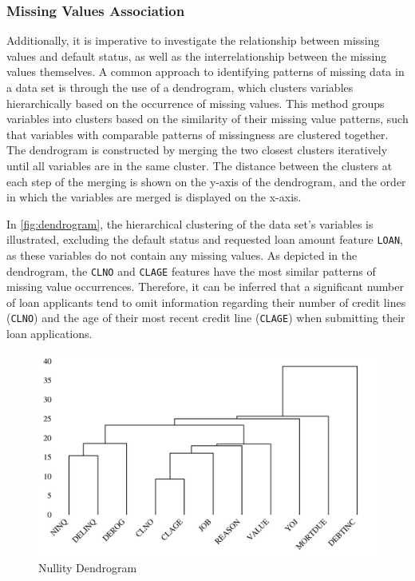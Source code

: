 \subsubsection{Missing Values Association}
\label{subsubsec:naass}
Additionally, it is imperative to investigate the relationship between missing values and default status, as well as the interrelationship between the missing values themselves.
A common approach to identifying patterns of missing data in a data set is through the use of a dendrogram, which clusters variables hierarchically based on the occurrence of missing values.
This method groups variables into clusters based on the similarity of their missing value patterns, such that variables with comparable patterns of missingness are clustered together.
The dendrogram is constructed by merging the two closest clusters iteratively until all variables are in the same cluster.
The distance between the clusters at each step of the merging is shown on the y-axis of the dendrogram, and the order in which the variables are merged is displayed on the x-axis.

In \autoref{fig:dendrogram}, the hierarchical clustering of the data set's variables is illustrated, excluding the default status and requested loan amount feature \texttt{LOAN}, as these variables do not contain any missing values.
As depicted in the dendrogram, the \texttt{CLNO} and \texttt{CLAGE} features have the most similar patterns of missing value occurrences.
Therefore, it can be inferred that a significant number of loan applicants tend to omit information regarding their number of credit lines (\texttt{CLNO}) and the age of their most recent credit line (\texttt{CLAGE}) when submitting their loan applications.

\begin{figure}[H]
    \centering
    \caption{Nullity Dendrogram}\vspace{0.5em}
    \label{fig:dendrogram}
    \includegraphics[width=140mm]{Figures/NA_Dendrogram.jpg}

    \vspace{-1em}
\end{figure}

